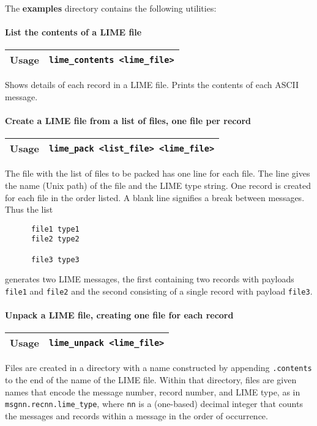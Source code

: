 \documentclass{article}
\begin{document}
The {\bf examples} directory contains the following utilities:

\paragraph{List the contents of a LIME file}
%
\begin{flushleft}
  \begin{tabular}{|l|l|}
  \hline
  Usage     & \verb|lime_contents <lime_file>| \\
  \hline
 \end{tabular}
\end{flushleft}
%
Shows details of each record in a LIME file.  Prints the contents of
each ASCII message.

\paragraph{Create a LIME file from a list of files, one file per record}
%
\begin{flushleft}
  \begin{tabular}{|l|l|}
  \hline
  Usage     & \verb|lime_pack <list_file> <lime_file>| \\
  \hline
 \end{tabular}
\end{flushleft}
%
The file with the list of files to be packed has one line for each file.
The line gives the name (Unix path) of the file and the LIME type string.
One record is created for each file in the order listed.  A blank line
signifies a break between messages.  Thus the list
%
\begin{verbatim}
      file1 type1
      file2 type2

      file3 type3
\end{verbatim}
%
generates two LIME messages, the first containing two records with
payloads {\tt file1} and {\tt file2} and the second consisting of a
single record with payload {\tt file3}.

\paragraph{Unpack a LIME file, creating one file for each record}
%
\begin{flushleft}
  \begin{tabular}{|l|l|}
  \hline
  Usage     & \verb|lime_unpack <lime_file>| \\
  \hline
 \end{tabular}
\end{flushleft}
%
Files are created in a directory with a name constructed by appending
{\tt .contents} to the end of the name of the LIME file.  Within that
directory, files are given names that encode the message number,
record number, and LIME type, as in {\tt msgnn.recnn.lime\_type},
where {\tt nn} is a (one-based) decimal integer that counts the
messages and records within a message in the order of occurrence.
\end{document}
